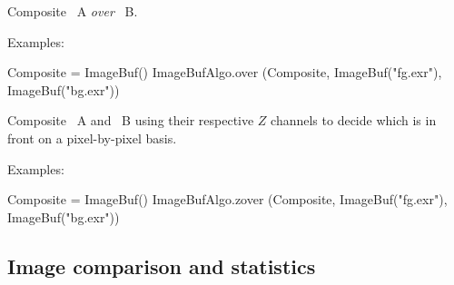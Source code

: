 Composite \ImageBuf\ {\cf A} \emph{over} \ImageBuf\ {\cf B}.

\smallskip
\noindent Examples:
\begin{code}
    Composite = ImageBuf()
    ImageBufAlgo.over (Composite, ImageBuf("fg.exr"), ImageBuf("bg.exr"))
\end{code}
\apiend


 

Composite \ImageBuf\ {\cf A} and \ImageBuf\ {\cf B} using their respective
$Z$ channels to decide which is in front on a pixel-by-pixel basis.

\smallskip
\noindent Examples:
\begin{code}
    Composite = ImageBuf()
    ImageBufAlgo.zover (Composite, ImageBuf("fg.exr"), ImageBuf("bg.exr"))
\end{code}
\apiend



\subsection{Image comparison and statistics}
\label{sec:iba:py:stats}

